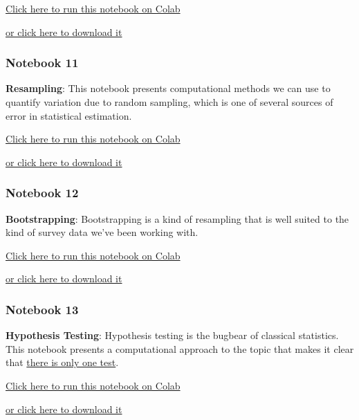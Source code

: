 \href{https://colab.research.google.com/github/AllenDowney/ElementsOfDataScience/blob/master/10_regression.ipynb}{Click
here to run this notebook on Colab}

\href{https://github.com/AllenDowney/ElementsOfDataScience/raw/master/10_regression.ipynb}{or
click here to download it}

\hypertarget{notebook-11}{%
\subsubsection{Notebook 11}\label{notebook-11}}

\textbf{Resampling}: This notebook presents computational methods we can
use to quantify variation due to random sampling, which is one of
several sources of error in statistical estimation.

\href{https://colab.research.google.com/github/AllenDowney/ElementsOfDataScience/blob/master/11_resampling.ipynb}{Click
here to run this notebook on Colab}

\href{https://github.com/AllenDowney/ElementsOfDataScience/raw/master/11_resampling.ipynb}{or
click here to download it}

\hypertarget{notebook-12}{%
\subsubsection{Notebook 12}\label{notebook-12}}

\textbf{Bootstrapping}: Bootstrapping is a kind of resampling that is
well suited to the kind of survey data we've been working with.

\href{https://colab.research.google.com/github/AllenDowney/ElementsOfDataScience/blob/master/12_bootstrap.ipynb}{Click
here to run this notebook on Colab}

\href{https://github.com/AllenDowney/ElementsOfDataScience/raw/master/12_bootstrap.ipynb}{or
click here to download it}

\hypertarget{notebook-13}{%
\subsubsection{Notebook 13}\label{notebook-13}}

\textbf{Hypothesis Testing}: Hypothesis testing is the bugbear of
classical statistics. This notebook presents a computational approach to
the topic that makes it clear that
\href{http://allendowney.blogspot.com/2016/06/there-is-still-only-one-test.html}{there
is only one test}.

\href{https://colab.research.google.com/github/AllenDowney/ElementsOfDataScience/blob/master/13_hypothesis.ipynb}{Click
here to run this notebook on Colab}

\href{https://github.com/AllenDowney/ElementsOfDataScience/raw/master/13_hypothesis.ipynb}{or
click here to download it}
